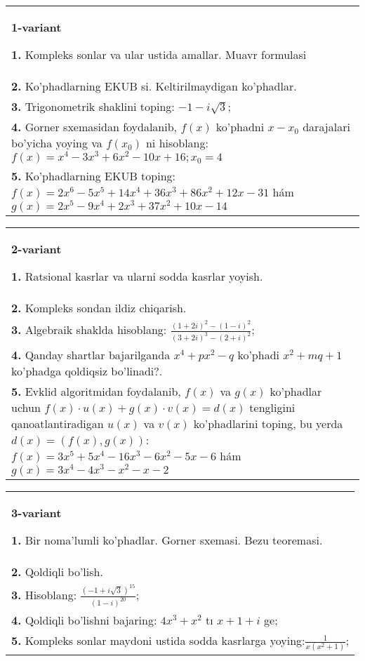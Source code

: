 \documentclass{article}
\begin{document}


\begin{tabular}{m{17cm}}
\textbf{1-variant}
\newline

\textbf{1.} Kompleks sonlar va ular ustida amallar. Muavr formulasi  \\
\textbf{2.} Ko’phadlarning EKUB si. Keltirilmaydigan ko’phadlar. \\
\textbf{3.} Trigonometrik shaklini toping: $-1-i \sqrt{3}$; \\
\textbf{4.} Gorner sxemasidan foydalanib, $f(x)$ ko’phadni $x-x_0$ darajalari bo’yicha yoying va $f\left(x_0\right)$ ni hisoblang: $f(x)=x^4-3 x^3+6 x^2-10 x+16 ; x_0=4$ \\
\textbf{5.} Ko’phadlarning EKUB toping:  $f(x)=2 x^6-5 x^5+14 x^4+36 x^3+86 x^2+12 x-31$ hám $g(x)=2 x^5-9 x^4+2 x^3+37 x^2+10 x-14$ \\

\end{tabular}
\vspace{1cm}


\begin{tabular}{m{17cm}}
\textbf{2-variant}
\newline

\textbf{1.} Ratsional kasrlar va ularni sodda kasrlar yoyish. \\
\textbf{2.} Kompleks sondan ildiz chiqarish. \\
\textbf{3.} Algebraik shaklda hisoblang:  $\frac{(1+2 i)^2-(1-i)^2}{(3+2 i)^3-(2+i)^2}$; \\
\textbf{4.} Qanday shartlar bajarilganda $x^4+p x^2-q$ ko’phadi $x^2+m q+1$ ko’phadga qoldiqsiz bo’linadi?. \\
\textbf{5.} Evklid algoritmidan foydalanib, $f(x)$ va $g(x)$ ko’phadlar uchun $f(x) \cdot u(x)+g(x) \cdot v(x)=d(x)$ tengligini qanoatlantiradigan $u(x)$ va $v(x)$ ko’phadlarini toping, bu yerda $d(x)=(f(x), g(x))$:  $f(x)=3 x^5+5 x^4-16 x^3-6 x^2-5 x-6$ hám $g(x)=3 x^4-4 x^3-x^2-x-2$ \\

\end{tabular}
\vspace{1cm}


\begin{tabular}{m{17cm}}
\textbf{3-variant}
\newline

\textbf{1.} Bir noma’lumli ko’phadlar. Gorner sxemasi. Bezu teoremasi.  \\
\textbf{2.} Qoldiqli bo’lish.  \\
\textbf{3.} Hisoblang:  $\frac{(-1+i \sqrt{3})^{15}}{(1-i)^{20}}$; \\
\textbf{4.} Qoldiqli bo’lishni bajaring: $4 x^3+x^2$ tı $x+1+i$ ge; \\
\textbf{5.} Kompleks sonlar maydoni ustida sodda kasrlarga yoying:$\frac{1}{x\left(x^2+1\right)}$; \\

\end{tabular}
\vspace{1cm}
\end{document}
